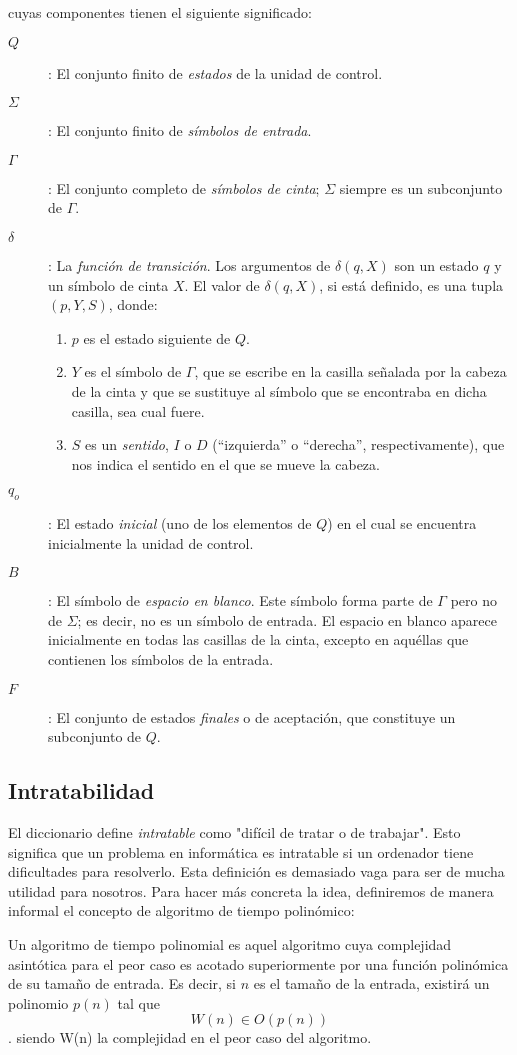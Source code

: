 cuyas componentes tienen el siguiente significado:\\
\begin{description}
\item[$Q$]: El conjunto finito de \emph{estados} de la unidad de control.
\item[$\Sigma$]: El conjunto finito de \emph{símbolos de entrada}.
\item[$\Gamma$]: El conjunto completo de \emph{símbolos de cinta}; $\Sigma$ siempre es un subconjunto de $\Gamma$.
\item[$\delta$]: \quad La \emph{función de transición}. Los argumentos de $\delta(q,X)$ son un estado $q$ y un símbolo de cinta $X$. El valor de $\delta(q,X)$, si está definido, es una tupla $(p,Y,S)$, donde:
  \begin{enumerate}
  \item $p$ es el estado siguiente de $Q$.
  \item $Y$ es el símbolo de $\Gamma$, que se escribe en la casilla señalada por la cabeza de la cinta y que se sustituye al símbolo que se encontraba en dicha casilla, sea cual fuere.
  \item $S$ es un \emph{sentido}, $I$ o $D$ (``izquierda'' o ``derecha'', respectivamente), que nos indica el sentido en el que se mueve la cabeza.
  \end{enumerate}
\item[$q_o$]: El estado \emph{inicial} (uno de los elementos de $Q$) en el cual se encuentra inicialmente la unidad de control.
\item[$B$]: El símbolo de \emph{espacio en blanco}. Este símbolo forma parte de $\Gamma$ pero no de $\Sigma$; es decir, no es un símbolo de entrada. El espacio en blanco aparece inicialmente en todas las casillas de la cinta, excepto en aquéllas que contienen los símbolos de la entrada.
\item[$F$]: El conjunto de estados \emph{finales} o de aceptación, que constituye un subconjunto de $Q$.
\end{description}

\subsection{Intratabilidad}

El diccionario define \emph{intratable} como "difícil de tratar o de trabajar". Esto significa que un problema en informática es intratable si un ordenador tiene dificultades para resolverlo. Esta definición es demasiado vaga para ser de mucha utilidad para nosotros. Para hacer más concreta la idea, definiremos de manera informal el concepto de algoritmo de tiempo polinómico:\\
\begin{fondo}
Un algoritmo de tiempo polinomial es aquel algoritmo cuya complejidad asintótica para el peor caso es acotado superiormente por una función polinómica de su tamaño de entrada. Es decir, si $n$ es el tamaño de la entrada, existirá un polinomio $p(n)$ tal que
\[ W(n) \in O(p(n)) \].
siendo W(n) la complejidad en el peor caso del algoritmo.
\end{fondo}

